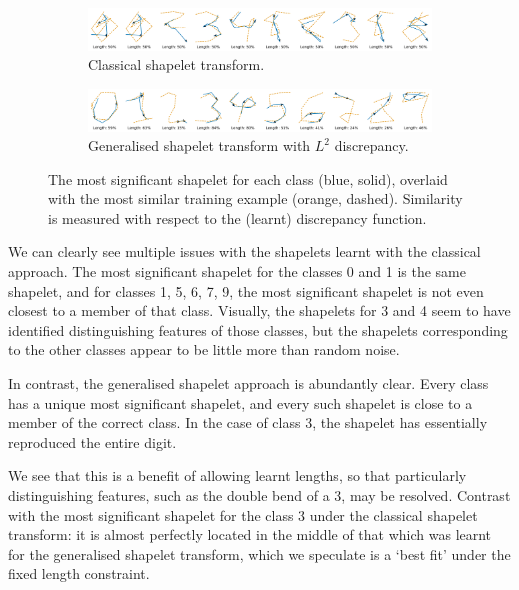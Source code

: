 \documentclass{article}
\theoremstyle{plain}
\theoremstyle{definition}
\begin{document}
\begin{figure}[t]
    \begin{subfigure}[b]{\linewidth}
        \centering
        \includegraphics[width=\linewidth]{images/old_pendigits.png}
        \caption{Classical shapelet transform.}
        \label{fig:old_shapelets}
    \end{subfigure}
    \begin{subfigure}[b]{\linewidth}
        \centering
        \includegraphics[width=\linewidth]{images/new_pendigits.png}
        \caption{Generalised shapelet transform with $L^2$ discrepancy.}
        \label{fig:new_shapelets}
    \end{subfigure}
    \caption{The most significant shapelet for each class (blue, solid), overlaid with the most similar training example (orange, dashed). Similarity is measured with respect to the (learnt) discrepancy function.}
    \label{fig:pendigits}
\end{figure}

We can clearly see multiple issues with the shapelets learnt with the classical approach. The most significant shapelet for the classes 0 and 1 is the same shapelet, and for classes 1, 5, 6, 7, 9, the most significant shapelet is not even closest to a member of that class. Visually, the shapelets for 3 and 4 seem to have identified distinguishing features of those classes, but the shapelets corresponding to the other classes appear to be little more than random noise.

In contrast, the generalised shapelet approach is abundantly clear. Every class has a unique most significant shapelet, and every such shapelet is close to a member of the correct class. In the case of class 3, the shapelet has essentially reproduced the entire digit.

We see that this is a benefit of allowing learnt lengths, so that particularly distinguishing features, such as the double bend of a 3, may be resolved. Contrast with the most significant shapelet for the class 3 under the classical shapelet transform: it is almost perfectly located in the middle of that which was learnt for the generalised shapelet transform, which we speculate is a `best fit' under the fixed length constraint.
\end{document}

